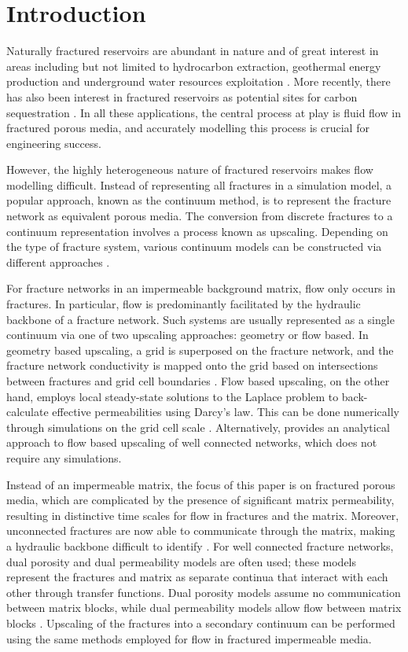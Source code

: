 \documentclass[draft]{agujournal2018}
\begin{document}
\section{Introduction}
Naturally fractured reservoirs are abundant in nature and of great interest in areas including but not limited to hydrocarbon extraction, geothermal energy production and underground water resources exploitation \citep{Berkowitz2002}. More recently, there has also been 
interest in fractured reservoirs as potential sites for carbon sequestration \citep{March2018}. In all these applications, the central process at play is fluid flow in fractured porous media, and accurately modelling this process is crucial for engineering success.

However, the highly heterogeneous nature of fractured reservoirs makes flow modelling difficult. Instead of representing all fractures in a simulation model, a popular approach, known as the continuum method, is to represent the fracture network as equivalent porous media. The conversion from discrete fractures to a continuum representation involves a process known as upscaling. Depending on the type of fracture system, various continuum models can be constructed via different approaches \citep{Berkowitz2002,Berre2018a}.

For fracture networks in an impermeable background matrix, flow only occurs in fractures. In particular, flow is predominantly facilitated by the hydraulic backbone of a fracture network. Such systems are usually represented as a single continuum via one of two upscaling approaches: geometry or flow based. In geometry based upscaling, a grid is superposed on the fracture network, and the fracture network conductivity is mapped onto the grid based on intersections between fractures and grid cell boundaries \citep{Botros2008, Roubinet2010, Svensson2001}. Flow based upscaling, on the other hand, employs local steady-state solutions to the Laplace problem to back-calculate effective permeabilities using Darcy's law. This can be done numerically through simulations on the grid cell scale \citep{Durlofsky1991, Jackson2000}. Alternatively, \citet{Oda1985} provides an analytical approach to flow based upscaling of well connected networks, which does not require any simulations.

Instead of an impermeable matrix, the focus of this paper is on fractured porous media, which are complicated by the presence of significant matrix permeability, resulting in distinctive time scales for flow in fractures and the matrix. Moreover, unconnected fractures are now able to communicate through the matrix, making a hydraulic backbone difficult to identify \citep{Matthai2004a}. For well connected fracture networks, dual porosity and dual permeability models are often used; these models represent the fractures and matrix as separate continua that interact with each other through transfer functions. Dual porosity models assume no communication between matrix blocks, while dual permeability models allow flow between matrix blocks \citep{Lemonnier2010, Warren1963}. Upscaling of the fractures into a secondary continuum can be performed using the same methods employed for flow in fractured impermeable media. 
\end{document}
